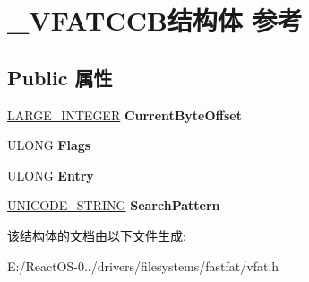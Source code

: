 \hypertarget{struct___v_f_a_t_c_c_b}{}\section{\+\_\+\+V\+F\+A\+T\+C\+C\+B结构体 参考}
\label{struct___v_f_a_t_c_c_b}
\subsection*{Public 属性}
\begin{DoxyCompactItemize}
\item 
\mbox{\label{struct___v_f_a_t_c_c_b_abc5809167e82b0b14891e11a17cbf4f0}} 
\hyperlink{union___l_a_r_g_e___i_n_t_e_g_e_r}{L\+A\+R\+G\+E\+\_\+\+I\+N\+T\+E\+G\+ER} {\bfseries Current\+Byte\+Offset}
\item 
\mbox{\label{struct___v_f_a_t_c_c_b_a41f5ce75c1aa0d0a4c5bc557256b7438}} 
U\+L\+O\+NG {\bfseries Flags}
\item 
\mbox{\label{struct___v_f_a_t_c_c_b_a607ad41c710036e6625071d122fb87c6}} 
U\+L\+O\+NG {\bfseries Entry}
\item 
\mbox{\label{struct___v_f_a_t_c_c_b_a645b2c698a8e01b74c532fba82d4aa67}} 
\hyperlink{struct___u_n_i_c_o_d_e___s_t_r_i_n_g}{U\+N\+I\+C\+O\+D\+E\+\_\+\+S\+T\+R\+I\+NG} {\bfseries Search\+Pattern}
\end{DoxyCompactItemize}


该结构体的文档由以下文件生成\+:\begin{DoxyCompactItemize}
\item 
E\+:/\+React\+O\+S-\/0../drivers/filesystems/fastfat/vfat.\+h\end{DoxyCompactItemize}
